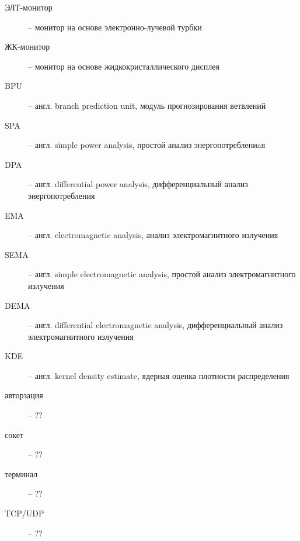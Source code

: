 
\begin{description}
\item[ЭЛТ-монитор] -- монитор на основе электронно-лучевой турбки
\item[ЖК-монитор] -- монитор на основе жидкокристаллического дисплея
\item[BPU] -- англ. branch prediction unit, модуль прогнозирования ветвлений
\item[SPA] -- англ. simple power analysis, простой анализ энергопотреблениaя
\item[DPA] -- англ. differential power analysis, дифференциальный анализ
  энергопотребления
\item[EMA] -- англ. electromagnetic analysis, анализ электромагнитного
  излучения
\item[SEMA] -- англ. simple electromagnetic analysis, простой анализ
  электромагнитного излучения
\item[DEMA] -- англ. differential electromagnetic analysis, дифференциальный
  анализ электромагнитного излучения
\item[KDE] -- англ. kernel density estimate, ядерная оценка плотности распределения
\end{description}

\clearpage


\begin{description}
\item[авторзация] -- ??
\item[сокет] -- ??
\item[терминал] -- ??
\item[TCP/UDP] -- ??
\end{description}

\clearpage
